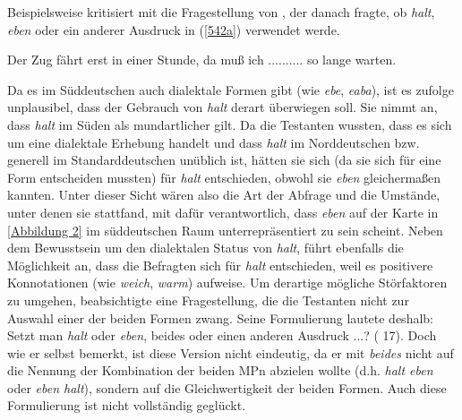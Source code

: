 Beispielsweise kritisiert \citet[16-17]{Elspass2005} mit \citet[174-178]{Hentschel1986} die Fragestellung von \citet{Eichhoff1978}, der danach fragte, ob \textit{halt}, \textit{eben} oder ein anderer Ausdruck in (\ref{542a}) verwendet werde.

\begin{exe}
	\ex\label{542a} 
 Der Zug fährt erst in einer Stunde, da muß ich .......... so lange warten.
\end{exe}																
Da es im Süddeutschen auch dialektale Formen gibt (wie \textit{ebe}, \textit{eaba}), ist es \citet[174]{Hentschel1986} zufolge unplausibel, dass der Gebrauch von \textit{halt} derart überwiegen soll. Sie nimmt an, dass \textit{halt} im Süden als mundartlicher gilt. Da die Testanten wussten, dass es sich um eine dialektale Erhebung handelt und dass \textit{halt} im Norddeutschen bzw. generell im Standarddeutschen unüblich ist, hätten sie sich (da sie sich für eine Form entscheiden mussten) für \textit{halt} entschieden, obwohl sie \textit{eben} gleichermaßen kannten. Unter dieser Sicht wären also die Art der Abfrage und die Umstände, unter denen sie stattfand, mit dafür verantwortlich, dass \textit{eben} auf der Karte in \ref{Abbildung 2} im süddeutschen Raum unterrepräsentiert zu sein scheint. Neben dem Bewusstsein um den dialektalen Status von \textit{halt}, führt \citet[176]{Hentschel1986} ebenfalls die Möglichkeit an, dass die Befragten sich für \textit{halt} entschieden, weil es positivere Konnotationen (wie \textit{weich}, \textit{warm}) aufweise. Um derartige mögliche Störfaktoren zu umgehen, beabsichtigte \citet{Elspass2005} eine Fragestellung, die die Testanten nicht zur Auswahl einer der beiden Formen zwang. Seine Formulierung lautete deshalb: \glqq Setzt man \textit{halt} oder \textit{eben}, beides oder einen anderen Ausdruck ...?\grqq{}  (\citealt[17, Fn 41]{Elspass2005} 17). Doch wie er selbst bemerkt, ist diese Version nicht eindeutig, da er mit \textit{beides} nicht auf die Nennung der Kombination der beiden MPn abzielen wollte (d.h. \textit{halt eben} oder \textit{eben halt}), sondern auf die Gleichwertigkeit der beiden Formen. Auch diese Formulierung ist nicht vollständig geglückt.

